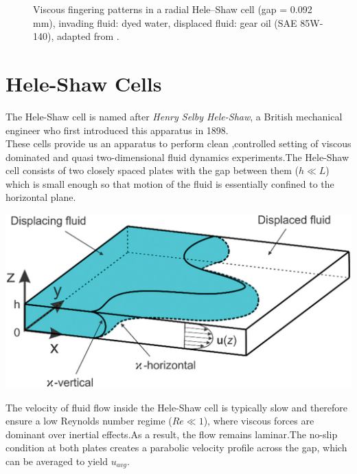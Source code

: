\documentclass[12pt,a4paper]{article}
\begin{document}
\begin{figure}[H]
  \caption[Viscous fingering in a radial Hele–Shaw cell]{%
    Viscous fingering patterns in a radial Hele–Shaw cell (gap = 0.092 mm), invading fluid: dyed water, displaced fluid: gear oil (SAE 85W-140), adapted from \cite{singh2021saffman} \cite{shokri2018saffman}.%
  }
  \label{fig:grid}
\end{figure}


\newpage
\section{Hele-Shaw Cells}
\begin{minipage}[t]{0.5\textwidth}
\vspace{0pt} 

The Hele-Shaw cell is named after \textit{Henry Selby Hele-Shaw}, a British mechanical engineer who first introduced this apparatus in 1898. \\

These cells provide us an apparatus to perform clean ,controlled setting of viscous dominated and quasi two-dimensional fluid dynamics experiments.The Hele-Shaw cell consists of two closely spaced plates with the gap between them ($h \ll L$) which is small enough so that motion of the fluid is essentially confined to the horizontal plane. \\



\end{minipage}
\hfill
\begin{minipage}[t]{0.45\textwidth}
\centering
\vspace{0pt} 
\includegraphics[width=0.95\linewidth]{hele-shaw-002.jpg}
\label{fig:hele-shaw}
\end{minipage}
The velocity of fluid flow inside the Hele-Shaw cell is typically slow and therefore ensure a low Reynolds number regime ($Re \ll 1$), where viscous forces are dominant over inertial effects.As a result, the flow remains laminar.The no-slip condition at both plates creates a parabolic velocity profile across the gap, which can be averaged to yield $u_{avg}$.
\end{document}
